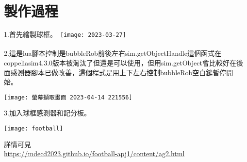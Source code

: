 \newpage
\section{製作過程}
1.首先繪製球框。\
\texttt{[image: 2023-03-27]}\\
\\2.這是lua腳本控制是bubbleRob前後左右sim.getObjectHandle這個函式在coppeliasim4.3.0版本被淘汰了但還是可以使用，但用sim.getObject會比較好在後面感測器腳本已做改善，這個程式是用上下左右控制bubbleRob空白鍵暫停開始。\
\begin{center}
\texttt{[image: 螢幕擷取畫面 2023-04-14 221556]}\\
\end{center}
 \newpage
3.加入球框感測器和記分板。\
\begin{center}
\texttt{[image: football]}
\end{center}

詳情可見\\
\href{https://mdecd2023.github.io/football-apj1/content/ag2.html}{https://mdecd2023.github.io/football-apj1/content/ag2.html}\\